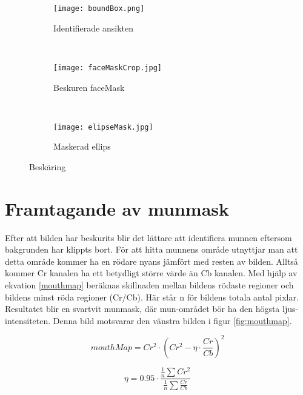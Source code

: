 \documentclass[a4paper,12pt,oneside,final]{extbook}
\begin{document}
\begin{figure}[h]
    \centering
    \begin{subfigure}[b]{0.3\textwidth}
        \texttt{[image: boundBox.png]}
        \caption{Identifierade ansikten}
        \label{fig:boundBox}
    \end{subfigure}
    ~ %
    \begin{subfigure}[b]{0.3\textwidth}
        \texttt{[image: faceMaskCrop.jpg]}
        \caption{Beskuren faceMask}
        \label{fig:faceMaskCrop}
    \end{subfigure}
    ~ %
    \begin{subfigure}[b]{0.3\textwidth}
        \texttt{[image: elipseMask.jpg]}
        \caption{Maskerad ellips}
        \label{fig:elipseMask}
    \end{subfigure}
    \caption{Beskäring}\label{fig:yolo}
\end{figure}

\section{Framtagande av munmask}

Efter att bilden har beskurits blir det lättare att identifiera munnen eftersom bakgrunden har klippts bort. För att hitta munnens område utnyttjar man att detta område kommer ha en rödare nyans jämfört med resten av bilden. Alltså kommer Cr kanalen ha ett betydligt större värde än Cb kanalen. Med hjälp av ekvation \ref{mouthmap} beräknas skillnaden mellan bildens rödaste regioner och bildens minst röda regioner (Cr/Cb). Här står n för bildens totala antal pixlar. Resultatet blir en svartvit munmask, där mun-området bör ha den högsta ljus-intensiteten. Denna bild motsvarar den vänstra bilden i figur \ref{fig:mouthmap}.

\begin{equation} \label{mouthmap}
mouthMap = Cr^2 \cdot (Cr^2 - \eta \cdot \frac{Cr}{Cb})^2
\end{equation}

\begin{equation} \label{mouthmap_eta}
\eta = 0.95 \cdot \frac{\frac{1}{n} \sum Cr^2}{\frac{1}{n} \sum \frac{Cr}{Cb}} 
\end{equation}
\end{document}
